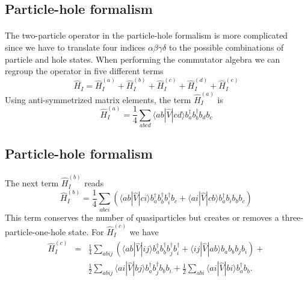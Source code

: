 \documentclass[%
twoside,                 %
final,                   %
10pt]{article}
\begin{document}
\subsection{Particle-hole formalism}

\paragraph{}
The two-particle operator in the particle-hole formalism  is more complicated since we have
to translate four indices $\alpha\beta\gamma\delta$ to the possible combinations of particle and hole
states.  When performing the commutator algebra we can regroup the operator in five different terms
\begin{equation}
	\hat{H}_I = \hat{H}_I^{(a)} + \hat{H}_I^{(b)} + \hat{H}_I^{(c)} + \hat{H}_I^{(d)} + \hat{H}_I^{(e)} \label{eq:2-65}
\end{equation}
Using anti-symmetrized  matrix elements, 
the term  $\hat{H}_I^{(a)}$ is  
\begin{equation}
	\hat{H}_I^{(a)} = \frac{1}{4}
	\sum_{abcd} \langle ab|\hat{V}|cd\rangle 
		b_a^\dagger b_b^\dagger b_d b_c \label{eq:2-66}
\end{equation}



\subsection{Particle-hole formalism}

\paragraph{}
The next term $\hat{H}_I^{(b)}$  reads
\begin{equation}
	 \hat{H}_I^{(b)} = \frac{1}{4} \sum_{abci}\left(\langle ab|\hat{V}|ci\rangle b_a^\dagger b_b^\dagger b_i^\dagger b_c +\langle ai|\hat{V}|cb\rangle b_a^\dagger b_i b_b b_c\right) \label{eq:2-67b}
\end{equation}
This term conserves the number of quasiparticles but creates or removes a 
three-particle-one-hole  state. 
For $\hat{H}_I^{(c)}$  we have
\begin{eqnarray}
	\hat{H}_I^{(c)}& =& \frac{1}{4}
		\sum_{abij}\left(\langle ab|\hat{V}|ij\rangle b_a^\dagger b_b^\dagger b_j^\dagger b_i^\dagger +
		\langle ij|\hat{V}|ab\rangle b_a  b_b b_j b_i \right)+  \nonumber \\
	&&	\frac{1}{2}\sum_{abij}\langle ai|\hat{V}|bj\rangle b_a^\dagger b_j^\dagger b_b b_i + 
		\frac{1}{2}\sum_{abi}\langle ai|\hat{V}|bi\rangle b_a^\dagger b_b. \label{eq:2-68c}
\end{eqnarray}
\end{document}
